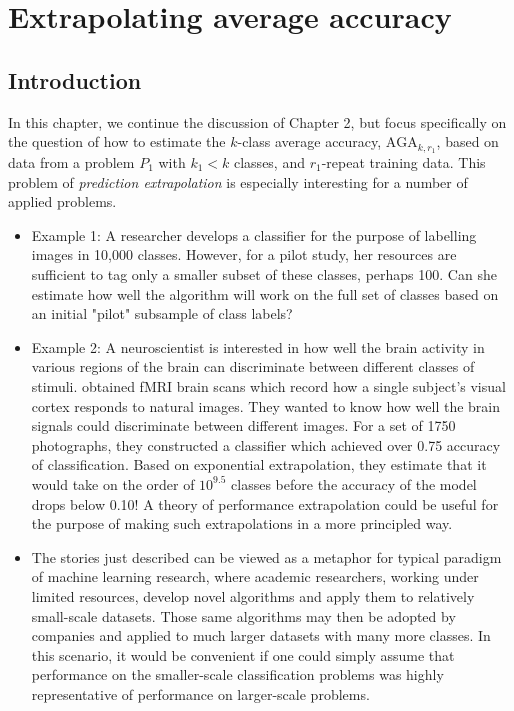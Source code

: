 
\chapter{Extrapolating average accuracy} %

\newcommand{\skone}{\mathcal{S}_{k_1}}
\newcommand{\sktwo}{\mathcal{S}_{k_2}}


\label{Chapter3} %

\section{Introduction}

In this chapter, we continue the discussion of Chapter 2, but focus
specifically on the question of how to estimate the $k$-class
average accuracy, $\text{AGA}_{k, r_1}$, based on data from a problem
$P_1$ with $k_1 < k$ classes, and $r_1$-repeat training data.
This problem of \emph{prediction extrapolation} is especially
interesting for a number of applied problems.

\begin{itemize} 
\item Example 1: A researcher develops a classifier for the purpose of labelling
images in 10,000 classes. However, for a pilot study, her resources are sufficient to 
tag only a smaller subset of these classes, perhaps 100. Can she estimate how well the algorithm 
will work on the full set of classes based on an initial "pilot" subsample of class labels?
\item Example 2: A neuroscientist is interested in how well the brain
  activity in various regions of the brain can discriminate between
  different classes of stimuli.  \cite{Kay2008a} obtained fMRI brain
  scans which record how a single subject's visual cortex responds to
  natural images. They wanted to know how well the brain signals could
  discriminate between different images. For a set of 1750
  photographs, they constructed a classifier which achieved over 0.75
  accuracy of classification. Based on exponential extrapolation, they
  estimate that it would take on the order of $10^{9.5}$ classes
  before the accuracy of the model drops below 0.10!  A theory of
  performance extrapolation could be useful for the purpose of making
  such extrapolations in a more principled way.
\item The stories just described can be viewed as a metaphor for
  typical paradigm of machine learning research, where academic
  researchers, working under limited resources, develop novel
  algorithms and apply them to relatively small-scale datasets. Those
  same algorithms may then be adopted by companies and applied to much
  larger datasets with many more classes. In this scenario, it would
  be convenient if one could simply assume that performance on the
  smaller-scale classification problems was highly representative of
  performance on larger-scale problems.
\end{itemize}

